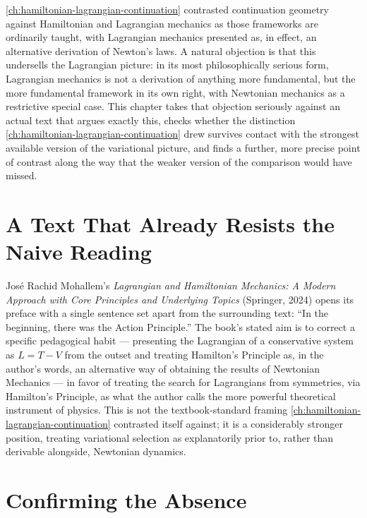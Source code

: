 \documentclass[11pt]{book}
\theoremstyle{plain}
\theoremstyle{definition}
\theoremstyle{remark}
\begin{document}
\cref{ch:hamiltonian-lagrangian-continuation} contrasted continuation
geometry against Hamiltonian and Lagrangian mechanics as those
frameworks are ordinarily taught, with Lagrangian mechanics presented
as, in effect, an alternative derivation of Newton's laws. A natural
objection is that this undersells the Lagrangian picture: in its most
philosophically serious form, Lagrangian mechanics is not a derivation
of anything more fundamental, but the more fundamental framework in
its own right, with Newtonian mechanics as a restrictive special case.
This chapter takes that objection seriously against an actual text
that argues exactly this, checks whether the distinction
\cref{ch:hamiltonian-lagrangian-continuation} drew survives contact
with the strongest available version of the variational picture, and
finds a further, more precise point of contrast along the way that the
weaker version of the comparison would have missed.

\section{A Text That Already Resists the Naive Reading}

José Rachid Mohallem's \emph{Lagrangian and Hamiltonian Mechanics: A
Modern Approach with Core Principles and Underlying Topics}
(Springer, 2024) opens its preface with a single sentence set apart
from the surrounding text: \enquote{In the beginning, there was the
Action Principle.} The book's stated aim is to correct a specific
pedagogical habit --- presenting the Lagrangian of a conservative
system as $L = T - V$ from the outset and treating Hamilton's
Principle as, in the author's words, an alternative way of obtaining
the results of Newtonian Mechanics --- in favor of treating the
search for Lagrangians from symmetries, via Hamilton's Principle, as
what the author calls the more powerful theoretical instrument of
physics. This is not the textbook-standard framing
\cref{ch:hamiltonian-lagrangian-continuation} contrasted itself
against; it is a considerably stronger position, treating variational
selection as explanatorily prior to, rather than derivable alongside,
Newtonian dynamics.

\section{Confirming the Absence}
\end{document}
